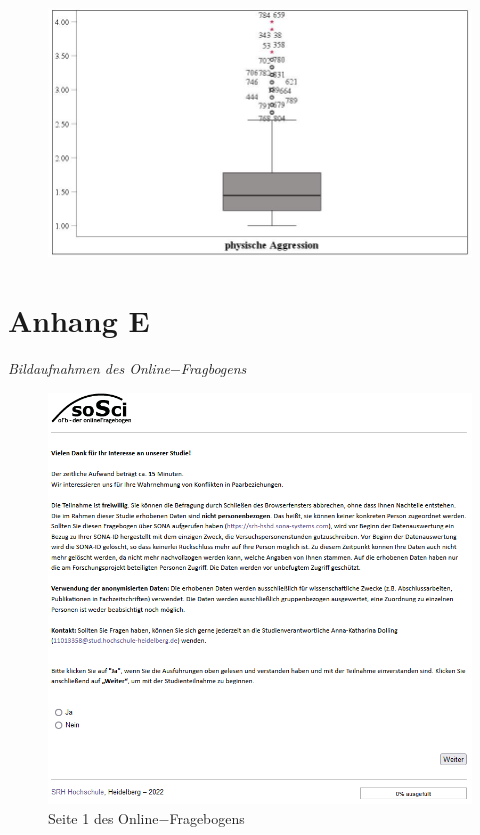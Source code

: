\begin{appendices}
    \begin{figure}[htb!]
        \centering
            \includegraphics[width=\textwidth]{Boxplot ph_aggro.jpg}

    \end{figure}
    
    


    \chapter*{Anhang E}  \label{Fragebogen}
    \noindent \textit{Bildaufnahmen des Online$-$Fragbogens}

    \begin{figure}[htb!]
        \centering
            \includegraphics[width=\textwidth]{Seite 1.png}
            \caption[]{Seite 1 des Online$-$Fragebogens}
    \end{figure}


\end{appendices}
